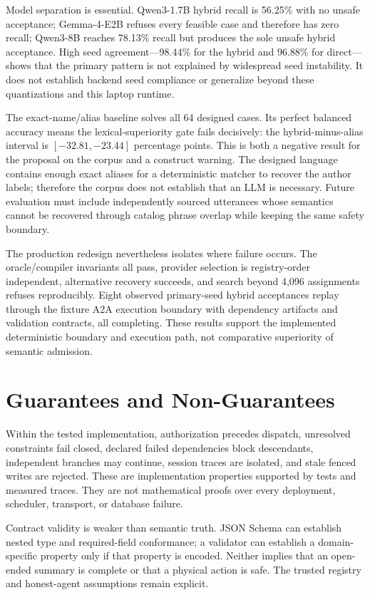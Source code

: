 Model separation is essential. Qwen3-1.7B hybrid recall is 56.25\% with no unsafe acceptance; Gemma-4-E2B refuses every feasible case and therefore has zero recall; Qwen3-8B reaches 78.13\% recall but produces the sole unsafe hybrid acceptance. High seed agreement---98.44\% for the hybrid and 96.88\% for direct---shows that the primary pattern is not explained by widespread seed instability. It does not establish backend seed compliance or generalize beyond these quantizations and this laptop runtime.

The exact-name/alias baseline solves all 64 designed cases. Its perfect balanced accuracy means the lexical-superiority gate fails decisively: the hybrid-minus-alias interval is $[-32.81,-23.44]$ percentage points. This is both a negative result for the proposal on the corpus and a construct warning. The designed language contains enough exact aliases for a deterministic matcher to recover the author labels; therefore the corpus does not establish that an LLM is necessary. Future evaluation must include independently sourced utterances whose semantics cannot be recovered through catalog phrase overlap while keeping the same safety boundary.

The production redesign nevertheless isolates where failure occurs. The oracle/compiler invariants all pass, provider selection is registry-order independent, alternative recovery succeeds, and search beyond 4,096 assignments refuses reproducibly. Eight observed primary-seed hybrid acceptances replay through the fixture A2A execution boundary with dependency artifacts and validation contracts, all completing. These results support the implemented deterministic boundary and execution path, not comparative superiority of semantic admission.

\section{Guarantees and Non-Guarantees}

Within the tested implementation, authorization precedes dispatch, unresolved constraints fail closed, declared failed dependencies block descendants, independent branches may continue, session traces are isolated, and stale fenced writes are rejected. These are implementation properties supported by tests and measured traces. They are not mathematical proofs over every deployment, scheduler, transport, or database failure.

Contract validity is weaker than semantic truth. JSON Schema can establish nested type and required-field conformance; a validator can establish a domain-specific property only if that property is encoded. Neither implies that an open-ended summary is complete or that a physical action is safe. The trusted registry and honest-agent assumptions remain explicit.

